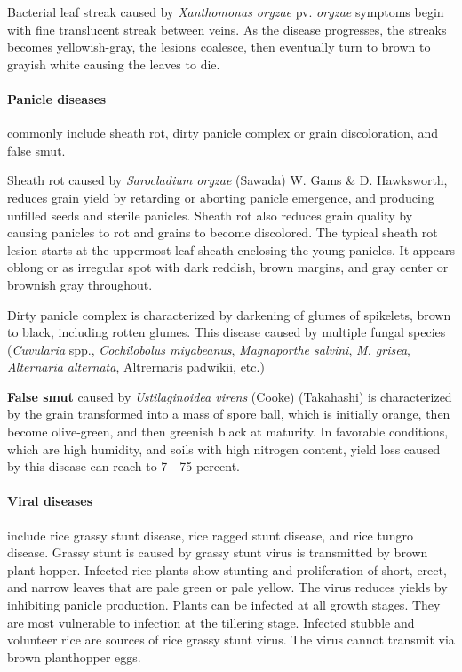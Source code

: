 Bacterial leaf streak caused by \textit{Xanthomonas oryzae} pv. \textit{oryzae} symptoms begin with fine translucent streak between veins. As the disease progresses, the streaks becomes yellowish-gray, the lesions coalesce, then eventually turn to brown to grayish white causing the leaves to die.

\paragraph{Panicle diseases} commonly include sheath rot, dirty panicle complex or grain discoloration, and false smut.

Sheath rot caused by \textit{Sarocladium oryzae} (Sawada) W. Gams \& D. Hawksworth, reduces grain yield by retarding or aborting panicle emergence, and producing unfilled seeds and sterile panicles. Sheath rot also reduces grain quality by causing panicles to rot and grains to become discolored. The typical sheath rot lesion starts at the uppermost leaf sheath enclosing the young panicles. It appears oblong or as irregular spot with dark reddish, brown margins, and gray center or brownish gray throughout.

Dirty panicle complex is characterized by darkening of glumes of spikelets, brown to black, including rotten glumes. This disease caused by multiple fungal species (\textit{Cuvularia} spp., \textit{Cochilobolus miyabeanus}, \textit{Magnaporthe salvini}, \textit{M. grisea}, \textit{Alternaria alternata}, Altrernaris padwikii, etc.)


\textbf{False smut} caused by \textit{Ustilaginoidea virens} (Cooke) (Takahashi) is characterized by the grain transformed into a mass of spore ball, which is initially orange, then become olive-green, and then greenish black at maturity. In favorable conditions, which are high humidity, and soils with high nitrogen content, yield loss caused by this disease can reach to 7 - 75 percent.

\paragraph{Viral diseases}include rice grassy stunt disease, rice ragged stunt disease, and rice tungro disease. Grassy stunt is caused by grassy stunt virus is transmitted by brown plant hopper. Infected rice plants show stunting and proliferation of short, erect, and narrow leaves that are pale green or pale yellow. The virus reduces yields by inhibiting panicle production. Plants can be infected at all growth stages. They are most vulnerable to infection at the tillering stage. Infected stubble and volunteer rice are sources of rice grassy stunt virus. The virus cannot transmit via brown planthopper eggs.


